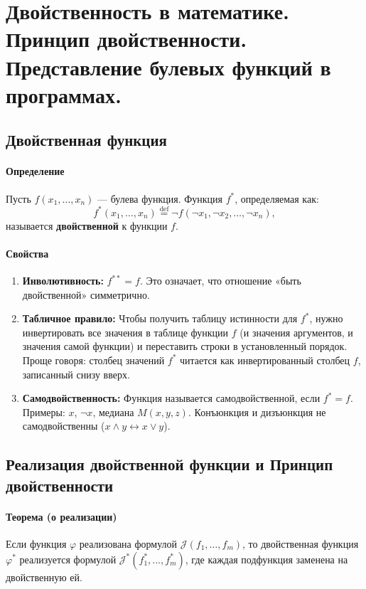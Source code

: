 \section{Двойственность в математике. Принцип двойственности. Представление булевых функций в программах.}

\subsection*{Двойственная функция}

\paragraph{Определение}
Пусть $f(x_1, \dots, x_n)$ — булева функция. Функция $f^*$, определяемая как:
$$f^*(x_1, \dots, x_n) \stackrel{\text{def}}{=} \neg f(\neg x_1, \neg x_2, \dots, \neg x_n),$$
называется \textbf{двойственной} к функции $f$.

\paragraph{Свойства}
\begin{enumerate}
    \item \textbf{Инволютивность:} $f^{**} = f$. Это означает, что отношение «быть двойственной» симметрично.
    \item \textbf{Табличное правило:} Чтобы получить таблицу истинности для $f^*$, нужно инвертировать все значения в таблице функции $f$ (и значения аргументов, и значения самой функции) и переставить строки в установленный порядок. Проще говоря: столбец значений $f^*$ читается как инвертированный столбец $f$, записанный снизу вверх.
    \item \textbf{Самодвойственность:} Функция называется самодвойственной, если $f^* = f$. Примеры: $x$, $\neg x$, медиана $M(x, y, z)$. Конъюнкция и дизъюнкция не самодвойственны ($x \land y \leftrightarrow x \lor y$).
\end{enumerate}

\subsection*{Реализация двойственной функции и Принцип двойственности}

\paragraph{Теорема (о реализации)}
Если функция $\varphi$ реализована формулой $\mathcal{J}(f_1, \dots, f_m)$, то двойственная функция $\varphi^*$ реализуется формулой $\mathcal{J}^*(f_1^*, \dots, f_m^*)$, где каждая подфункция заменена на двойственную ей.

